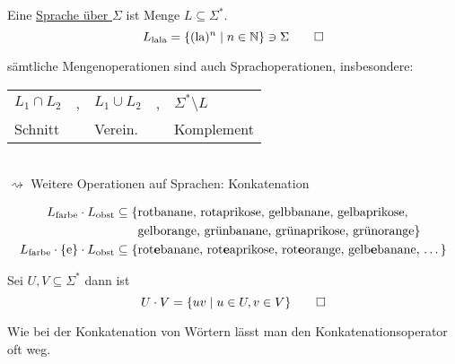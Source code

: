 \begin{Def}[name={[Sprache über $\Sigma$]}]
	Eine \underline{Sprache über $\Sigma$} ist Menge $L\subseteq\Sigma^*$.
	\[ L_\text{lala} = \{(\text{la})^n \mid n\in\mathbb{N}\} \ni\Sigma
	\qedhere \]
\end{Def}
sämtliche Mengenoperationen sind auch Sprachoperationen, insbesondere:\medskip\\
\begin{tabular}{lllll}
	$L_1\cap L_2$ &,& $L_1\cup L_2$ &,& $\Sigma^*\setminus L$\\
	Schnitt && Verein. && Komplement
\end{tabular}\medskip\\
$\rightsquigarrow$ Weitere Operationen auf Sprachen: Konkatenation
\begin{Bsp*}
	\begin{align*}
		L_\text{farbe}\cdot L_\text{obst} &\subseteq \{\text{rotbanane, rotaprikose, gelbbanane, gelbaprikose,}\\
		&\phantom{{}\subseteq \{}\text{gelborange, grünbanane, grünaprikose, grünorange}\}\\
		L_\text{farbe}\cdot\{\text{e}\}\cdot L_\text{obst} &\subseteq \{ \text{rot\textbf{e}banane, rot\textbf{e}aprikose, rot\textbf{e}orange, gelb\textbf{e}banane, \dots} \}
	\end{align*}
\end{Bsp*}
\begin{Def} %
	Sei $U,V\subseteq \Sigma^*$ dann ist
	\[ U\cdot V = \{uv \mid u\in U, v\in V \} \qedhere \]
\end{Def}
Wie bei der Konkatenation von Wörtern lässt man den Konkatenationsoperator oft weg.



